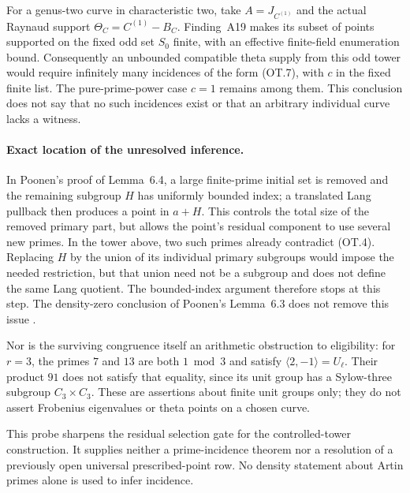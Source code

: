 For a genus-two curve in characteristic two, take
$A=J_{C^{(1)}}$ and the actual Raynaud support
$\Theta_C=C^{(1)}-B_C$.  Finding~A19 makes its subset of points
supported on the fixed odd set $S_0$ finite, with an effective
finite-field enumeration bound.  Consequently an unbounded
compatible theta supply from this odd tower would require
infinitely many incidences of the form (OT.7), with $c$ in the
fixed finite list.  The pure-prime-power case $c=1$ remains among
them.  This conclusion does not say that no such incidences
exist or that an arbitrary individual curve lacks a witness.

\paragraph{Exact location of the unresolved inference.}
In Poonen's proof of Lemma~6.4, a large finite-prime initial set
is removed and the remaining subgroup $H$ has uniformly bounded
index; a translated Lang pullback then produces a point in
$a+H$.  This controls the total size of the removed primary
part, but allows the point's residual component to use several
new primes.  In the tower above, two such primes already
contradict (OT.4).  Replacing $H$ by the union of its individual
primary subgroups would impose the needed restriction, but
that union need not be a subgroup and does not define the same
Lang quotient.  The bounded-index argument therefore stops at
this step.  The density-zero conclusion of Poonen's
Lemma~6.3 does not remove this issue
\cite[Lemmas~6.3--6.6]{Poonen2005}.

Nor is the surviving congruence itself an arithmetic obstruction
to eligibility: for $r=3$, the primes $7$ and $13$ are both
$1\bmod3$ and satisfy $\langle2,-1\rangle=U_\ell$.
Their product $91$ does not satisfy that equality, since its
unit group has a Sylow-three subgroup $C_3\times C_3$.
These are assertions about finite unit groups only; they do not
assert Frobenius eigenvalues or theta points on a chosen curve.

This probe sharpens the residual selection gate for the
controlled-tower construction.  It supplies neither a
prime-incidence theorem nor a resolution of a previously open
universal prescribed-point row.  No density statement about
Artin primes alone is used to infer incidence.

